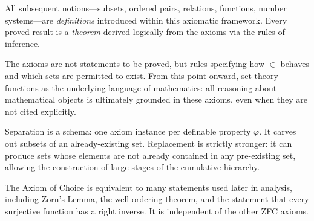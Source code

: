 \begin{remark*}[Exposition]
All subsequent notions---subsets, ordered pairs, relations, functions,
number systems---are \emph{definitions} introduced within this axiomatic
framework. Every proved result is a \emph{theorem} derived logically from the
axioms via the rules of inference.
\end{remark*}

\begin{remark*}[Exposition]
The axioms are not statements to be proved, but rules specifying how $\in$
behaves and which sets are permitted to exist. From this point onward, set
theory functions as the underlying language of mathematics: all reasoning
about mathematical objects is ultimately grounded in these axioms, even when
they are not cited explicitly.
\end{remark*}

\begin{remark*}[Exposition]
Separation is a schema: one axiom instance per definable property $\varphi$.
It carves out subsets of an already-existing set. Replacement is strictly
stronger: it can produce sets whose elements are not already contained in any
pre-existing set, allowing the construction of large stages of the cumulative
hierarchy.
\end{remark*}

\begin{remark*}[Exposition]
The Axiom of Choice is equivalent to many statements used later in analysis,
including Zorn's Lemma, the well-ordering theorem, and the statement that every
surjective function has a right inverse. It is independent of the other ZFC
axioms.
\end{remark*}

\DefinitionalRoot
